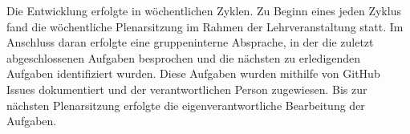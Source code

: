 Die Entwicklung erfolgte in wöchentlichen Zyklen.
Zu Beginn eines jeden Zyklus fand die wöchentliche Plenarsitzung im Rahmen der Lehrveranstaltung statt.
Im Anschluss daran erfolgte eine gruppeninterne Absprache, in der die zuletzt abgeschlossenen Aufgaben besprochen und die nächsten zu erledigenden Aufgaben identifiziert wurden.
Diese Aufgaben wurden mithilfe von GitHub Issues dokumentiert und der verantwortlichen Person zugewiesen.
Bis zur nächsten Plenarsitzung erfolgte die eigenverantwortliche Bearbeitung der Aufgaben.
